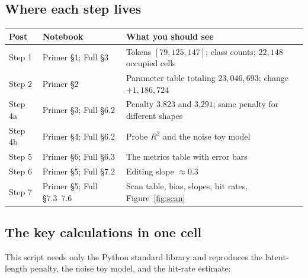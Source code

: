 \documentclass[11pt]{article}
\begin{document}
\subsection{Where each step lives}
\begin{center}
\small
\begin{tabular}{@{}llp{6.4cm}@{}}
\toprule
Post & Notebook & What you should see\\
\midrule
Step 1 & Primer \S1; Full \S3 & Tokens $[79,125,147]$; class counts; $22{,}148$ occupied cells\\
Step 2 & Primer \S2 & Parameter table totaling $23{,}046{,}693$; change $+1{,}186{,}724$\\
Step 4a & Primer \S3; Full \S6.2 & Penalty $3.823$ and $3.291$; same penalty for different shapes\\
Step 4b & Primer \S4; Full \S6.2 & Probe $R^2$ and the noise toy model\\
Step 5 & Primer \S6; Full \S6.3 & The metrics table with error bars\\
Step 6 & Primer \S5; Full \S7.2 & Editing slope $\approx0.3$\\
Step 7 & Primer \S5; Full \S7.3--7.6 & Scan table, bias, slopes, hit rates, Figure~\ref{fig:scan}\\
\bottomrule
\end{tabular}
\end{center}

\subsection{The key calculations in one cell}
This script needs only the Python standard library and reproduces the latent-length penalty, the noise toy model, and the hit-rate estimate:
\end{document}
